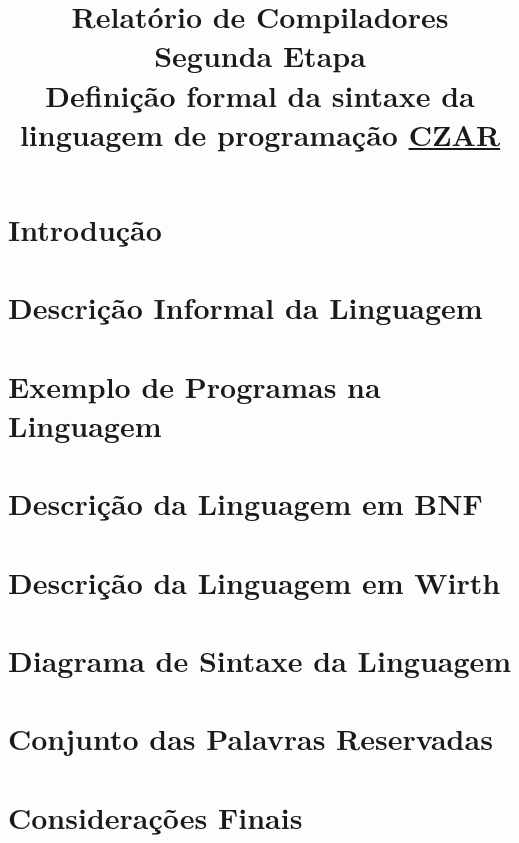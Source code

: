 \documentclass[12pt,oneside,a4paper,english]{abntex2}
\title{Relatório de Compiladores\\Segunda Etapa\\Definição formal da sintaxe da linguagem de programação \underline{CZAR}}
\begin{document}
\frenchspacing %

\imprimirfolhaderosto

\clearpage
\begin{resumo}
	
\end{resumo}

\tableofcontents

\textual

\chapter{Introdução}
\label{chap:introducao}
	

\chapter{Descrição Informal da Linguagem}
\label{chap:descricao-informal}
	

\chapter{Exemplo de Programas na Linguagem}
\label{chap:exemplo-programa}
	

\chapter{Descrição da Linguagem em BNF}
\label{chap:bnf}
	

\chapter{Descrição da Linguagem em Wirth}
\label{chap:wirth}
	

\chapter{Diagrama de Sintaxe da Linguagem}
\label{chap:diagrama}
	

\chapter{Conjunto das Palavras Reservadas}
\label{chap:palavras-reservadas}
	

\chapter{Considerações Finais}
\label{chap:conclusao}
	


\end{document}
